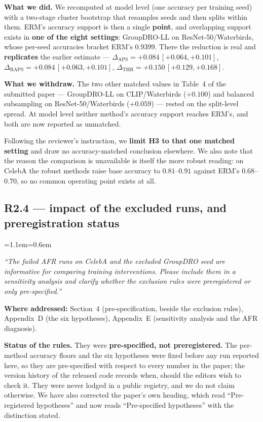 \documentclass[11pt,a4paper]{article}
\newenvironment{reviewer}
  {\begin{list}{}{\leftmargin=1.1em\rightmargin=0.6em}\item[]\itshape\color{revgrey}\small}
  {\end{list}}
\newcommand{\where}[1]{{\textbf{Where addressed:} #1\par}}
\newcommand{\rpoint}[2]{\subsection*{#1 --- #2}}
\begin{document}
\textbf{What we did.} We recomputed at model level (one accuracy per training seed) with a two-stage
cluster bootstrap that resamples seeds and then splits within them. ERM's accuracy support is then a
single \textbf{point}, and overlapping support exists in \textbf{one of the eight settings}:
GroupDRO-LL on ResNet-50/Waterbirds, whose per-seed accuracies bracket ERM's $0.9399$. There the
reduction is real and \textbf{replicates} the earlier estimate ---
$\Delta_{\mathrm{APS}} = +0.084\,[+0.064, +0.101]$,
$\Delta_{\mathrm{RAPS}} = +0.084\,[+0.063, +0.101]$,
$\Delta_{\mathrm{THR}} = +0.150\,[+0.129, +0.168]$.

\textbf{What we withdraw.} The two other matched values in Table~4 of the submitted paper --- GroupDRO-LL on
CLIP/Waterbirds ($+0.100$) and balanced subsampling on ResNet-50/Waterbirds ($+0.059$) --- rested on
the split-level spread. At model level neither method's accuracy support reaches ERM's, and both are
now reported as unmatched.

Following the reviewer's instruction, we \textbf{limit H3 to that one matched setting} and draw no
accuracy-matched conclusion elsewhere. We also note that the reason the comparison is unavailable is
itself the more robust reading: on CelebA the robust methods raise base accuracy to $0.81$--$0.91$
against ERM's $0.68$--$0.70$, so no common operating point exists at all.

\rpoint{R2.4}{impact of the excluded runs, and preregistration status}

\begin{reviewer}
``The failed AFR runs on CelebA and the excluded GroupDRO seed are informative for comparing
training interventions. Please include them in a sensitivity analysis and clarify whether the
exclusion rules were preregistered or only pre-specified.''
\end{reviewer}

\where{Section~4 (pre-specification, beside the exclusion rules), Appendix~D (the six hypotheses), Appendix~E (sensitivity analysis and the AFR
diagnosis).}

\textbf{Status of the rules.} They were \textbf{pre-specified, not preregistered.} The per-method
accuracy floors and the six hypotheses were fixed before any run reported here, so they are
pre-specified with respect to every number in the paper; the version history of the released code
records when, should the editors wish to check it. They were never lodged in a public registry,
and we do not claim otherwise. We have also corrected the paper's own
heading, which read ``Pre-registered hypotheses'' and now reads ``Pre-specified hypotheses'' with
the distinction stated.
\end{document}
